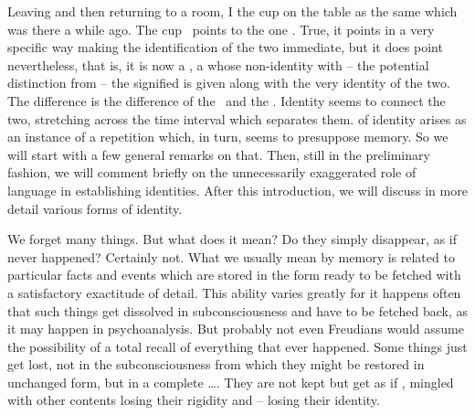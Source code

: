 Leaving and then returning to a room, I  the cup on the table as
the same which was there a while ago.  The cup \ points to the
one .  True, it points in a very specific way making the
identification of the two immediate, but it does point nevertheless, that is, it
is now a , a  whose non-identity with -- the
potential distinction from -- the signified is given along with the very
identity of the two. The difference is the difference of the 
\herenow\ and the  \thth. Identity seems to connect the two,
stretching across the time interval which separates them.   of
identity arises as an instance of a repetition which, in turn, seems to
presuppose memory. So we will start with a few general remarks on that. Then,
still in the preliminary fashion, we will comment briefly on the unnecessarily
exaggerated role of language in establishing identities. After this
introduction, we will discuss in more detail various forms of identity.


We forget many things.  But what does it mean?  Do they simply disappear,
as if never happened?  Certainly not.  What we usually mean by memory is related
to particular facts and  events which are stored in the 
form ready to be fetched with a satisfactory exactitude of detail.  This ability
varies greatly for it happens often that such  things get dissolved
in subconsciousness and have to be fetched back, as it may happen in
psychoanalysis.  But probably not even Freudians would assume the possibility of
a total recall of everything that ever happened. Some things just get lost, not
in the subconsciousness from which they might be restored in unchanged form, but
in a complete \ldots {}.  They are not kept  but get as if , mingled with other contents
losing their rigidity and  -- losing their identity.

